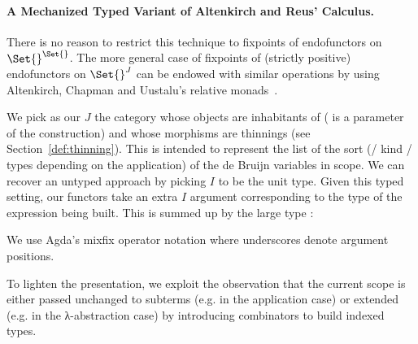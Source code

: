 \paragraph{A Mechanized Typed Variant of Altenkirch and Reus' Calculus.}\label{section:mech-reus}

There is no reason to restrict this technique to fixpoints of endofunctors
on $\Set{}^{\Set{}}$. The more general
case of fixpoints of (strictly positive) endofunctors on $\Set{}^J$ can be
endowed with similar operations by using Altenkirch, Chapman and
Uustalu's relative monads~\citeyear{Altenkirch2010, JFR4389}.

We pick as our $J$ the category whose objects are inhabitants of
  ( is a parameter of the construction) and whose morphisms are
thinnings (see Section~\ref{def:thinning}).  This   is
intended to represent the list of the sort (/ kind / types depending
on the application) of the de Bruijn variables in scope. We can
recover an untyped approach by picking $I$ to be the unit type.  Given
this typed setting, our functors take an extra $I$ argument
corresponding to the type of the expression being built. This is
summed up by the large type 
:%

\begin{center}
\end{center}

We use Agda's mixfix operator notation where underscores denote
argument positions.

To lighten the presentation, we exploit the observation that the
current scope is either passed unchanged to subterms (e.g. in the application case)
or extended (e.g. in the λ-abstraction case) by introducing combinators
to build indexed types.

\begin{center}
\begin{minipage}{0.4\textwidth}
\end{minipage}\hfill
\begin{minipage}{0.5\textwidth}
\end{minipage}
\newline
\begin{minipage}{0.4\textwidth}
\end{minipage}\hfill
\begin{minipage}{0.5\textwidth}
\end{minipage}
\end{center}

